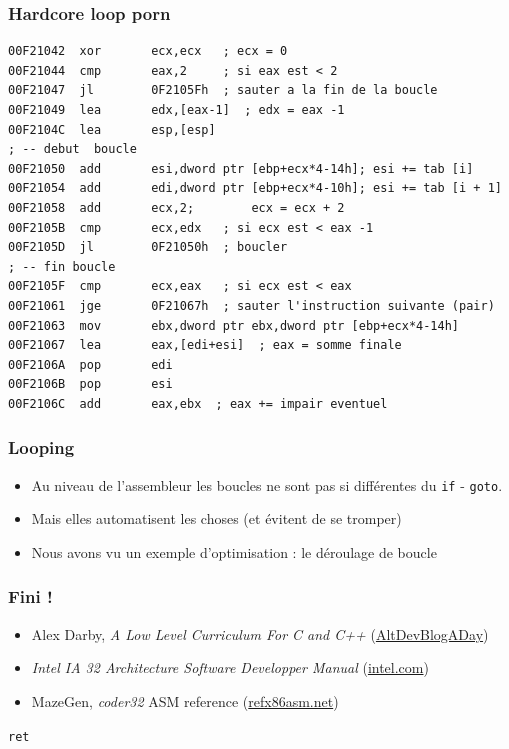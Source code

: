 \documentclass{beamer}
\begin{document}
\begin{frame}[fragile]
\frametitle{Hardcore loop porn}
\begin{lstlisting}[language={[x86masm]Assembler}, basicstyle={\scriptsize\ttfamily}]
00F21042  xor       ecx,ecx   ; ecx = 0 
00F21044  cmp       eax,2     ; si eax est < 2
00F21047  jl        0F2105Fh  ; sauter a la fin de la boucle 
00F21049  lea       edx,[eax-1]  ; edx = eax -1
00F2104C  lea       esp,[esp]  
; -- debut  boucle
00F21050  add       esi,dword ptr [ebp+ecx*4-14h]; esi += tab [i] 
00F21054  add       edi,dword ptr [ebp+ecx*4-10h]; esi += tab [i + 1]
00F21058  add       ecx,2;		  ecx = ecx + 2
00F2105B  cmp       ecx,edx   ; si ecx est < eax -1 
00F2105D  jl        0F21050h  ; boucler
; -- fin boucle
00F2105F  cmp       ecx,eax   ; si ecx est < eax 
00F21061  jge       0F21067h  ; sauter l'instruction suivante (pair)
00F21063  mov       ebx,dword ptr ebx,dword ptr [ebp+ecx*4-14h]   
00F21067  lea       eax,[edi+esi]  ; eax = somme finale
00F2106A  pop       edi  
00F2106B  pop       esi  
00F2106C  add       eax,ebx  ; eax += impair eventuel
\end{lstlisting}
\end{frame}

\begin{frame}[fragile]
\frametitle{Looping}
\begin{block}{}
\begin{itemize}
\item Au niveau de l'assembleur les boucles ne sont pas si différentes du  \lstinline+if+ - \lstinline+goto+.
\item Mais elles automatisent les choses (et évitent de se tromper)
\item Nous avons vu un exemple d'optimisation : le déroulage de boucle
\end{itemize}
\end{block}
\end{frame}

\begin{frame}[fragile]
\frametitle{Fini !}

\begin{itemize}
\item Alex Darby, \textit{A Low Level Curriculum For C and C++} (\href{http://http://www.altdevblogaday.com/2011/11/09/a-low-level-curriculum-for-c-and-c/}{AltDevBlogADay})
\item \textit{Intel IA 32 Architecture Software Developper Manual} (\href{http://download.intel.com/products/processor/manual/325462.pdf}{intel.com})
\item MazeGen, \textit{coder32} ASM reference (\href{http://ref.x86asm.net}{refx86asm.net})
\end{itemize}

\begin{center}
\begin{large}
\lstinline[language={[x86masm]Assembler}]+ret+ 
\end{large}
\end{center}
\end{frame}
\end{document}
